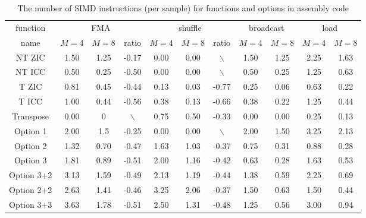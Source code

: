 \begin{table}[t]
    \caption{The number of SIMD instructions (per sample) for functions and options in assembly code}  %
    \centering %
    \setlength{\tabcolsep}{1.6pt}
    \begin{tabular}{c|c|c|c|c|c|c|c|c|c|c} %
    \hline\hline %
    function & \multicolumn{3}{c|}{FMA} & \multicolumn{3}{c|}{shuffle} & \multicolumn{2}{c|}{broadcast} & \multicolumn{2}{c}{load} \\ [0.3ex]
    \cline{2-11}
    name & $M{=}4$ & $M{=}8$ & ratio & $M{=}4$ & $M{=}8$ & ratio & $M{=}4$ & $M{=}8$ & $M{=}4$ & $M{=}8$ \\ [0.3ex] %
    \hline
    NT ZIC & 1.50 & 1.25 & -0.17 & 0.00 & 0.00 & $\backslash$ & 1.50 & 1.25 & 2.25 & 1.63 \\ [0.3ex]
    NT ICC & 0.50 & 0.25 & -0.50 & 0.00 & 0.00 & $\backslash$ & 0.50 & 0.25 & 1.25 & 0.63 \\ [0.3ex]
    T ZIC & 0.81 & 0.45 & -0.44 & 0.13 & 0.03 & -0.77 & 0.25 & 0.06 & 0.63 & 0.22 \\ [0.3ex]
    T ICC & 1.00 & 0.44 & -0.56 & 0.38 & 0.13 & -0.66 & 0.38 & 0.22 & 1.25 & 0.44 \\ [0.3ex]
    Transpose & 0.00 & 0 & $\backslash$ & 0.75 & 0.50 & -0.33 & 0.00 & 0.00 & 0.25 & 0.13 \\ [0.3ex]
    Option 1 & 2.00 & 1.5 & -0.25 & 0.00 & 0.00 & $\backslash$ & 2.00 & 1.50 & 3.25 & 2.13 \\ [0.3ex]
    Option 2 & 1.32 & 0.70 & -0.47 & 1.63 & 1.03 & -0.37 & 0.75 & 0.31 & 0.88 & 0.28 \\ [0.3ex]
    Option 3 & 1.81 & 0.89 & -0.51 & 2.00 & 1.16 & -0.42 & 0.63 & 0.28 & 1.63 & 0.53 \\ [0.3ex]
    Option 3+2 & 3.13 & 1.59 & -0.49 & 2.13 & 1.19 & -0.44 & 1.38 & 0.59 & 2.25 & 0.69 \\ [0.3ex]
    Option 2+2 & 2.63 & 1.41 & -0.46 & 3.25 & 2.06 & -0.37 & 1.50 & 0.63 & 1.50 & 0.44 \\ [0.3ex]
    Option 3+3 & 3.63 & 1.78 & -0.51 & 2.50 & 1.31 & -0.48 & 1.25 & 0.56 & 3.00 & 0.94 \\ [1ex]
    \hline
    \end{tabular}
    \label{table:number_of_instructions_in_assembly} %
\end{table}

